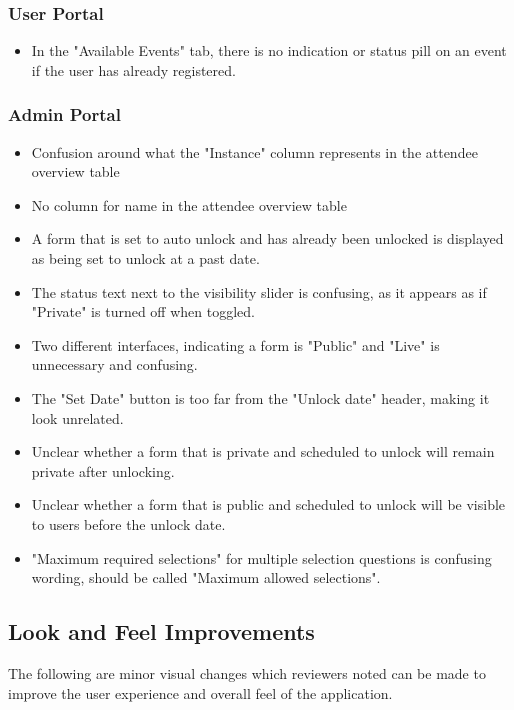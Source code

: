 \documentclass[12pt, titlepage]{article}
\begin{document}
\subsubsection{User Portal}
\begin{itemize}
    \item In the "Available Events" tab, there is no indication or status pill on an event if the user has already registered.
\end{itemize}

\subsubsection{Admin Portal}
\begin{itemize}
    \item Confusion around what the "Instance" column represents in the attendee overview table
    \item No column for name in the attendee overview table
    \item A form that is set to auto unlock and has already been unlocked is displayed as being set to unlock at a past date.
    \item The status text next to the visibility slider is confusing, as it appears as if "Private" is turned off when toggled.
    \item Two different interfaces, indicating a form is "Public" and "Live" is unnecessary and confusing.
    \item The "Set Date" button is too far from the "Unlock date" header, making it look unrelated.
    \item Unclear whether a form that is private and scheduled to unlock will remain private after unlocking.
    \item Unclear whether a form that is public and scheduled to unlock will be visible to users before the unlock date.
    \item "Maximum required selections" for multiple selection questions is confusing wording, should be called "Maximum allowed selections".
\end{itemize}

\subsection{Look and Feel Improvements}

The following are minor visual changes which reviewers noted can be made to improve the user experience and overall feel of the application.
\end{document}
